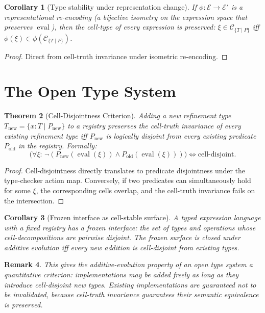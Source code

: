 \documentclass[11pt,a4paper]{article}
\newtheorem{theorem}{Theorem}[section]
\newtheorem{corollary}[theorem]{Corollary}
\newtheorem{remark}[theorem]{Remark}
\DeclareMathOperator{\eval}{eval}
\newcommand{\Cell}{\mathcal{C}}
\begin{document}
\begin{corollary}[Type stability under representation change]
\label{cor:type-stability}
If $\phi : \mathcal{E} \to \mathcal{E}'$ is a representational re-encoding (a bijective isometry on the expression space that preserves $\eval$), then the cell-type of every expression is preserved: $\xi \in \Cell_{\{T \mid P\}}$ iff $\phi(\xi) \in \phi(\Cell_{\{T \mid P\}})$.
\end{corollary}

\begin{proof}
Direct from cell-truth invariance under isometric re-encoding.
\end{proof}

\section{The Open Type System}
\label{sec:open-types}

\begin{theorem}[Cell-Disjointness Criterion]
\label{thm:cell-disjoint}
Adding a new refinement type $T_{\mathrm{new}} = \{x : T \mid P_{\mathrm{new}}\}$ to a registry preserves the cell-truth invariance of every existing refinement type iff $P_{\mathrm{new}}$ is logically disjoint from every existing predicate $P_{\mathrm{old}}$ in the registry. Formally:
\[
\bigl(\forall \xi : \, \neg(P_{\mathrm{new}}(\eval(\xi)) \wedge P_{\mathrm{old}}(\eval(\xi)))\bigr) \iff \mathrm{cell\text{-}disjoint}.
\]
\end{theorem}

\begin{proof}
Cell-disjointness directly translates to predicate disjointness under the type-checker action map. Conversely, if two predicates can simultaneously hold for some $\xi$, the corresponding cells overlap, and the cell-truth invariance fails on the intersection.
\end{proof}

\begin{corollary}[Frozen interface as cell-stable surface]
\label{cor:frozen-interface}
A typed expression language with a fixed registry has a \emph{frozen interface}: the set of types and operations whose cell-decompositions are pairwise disjoint. The frozen surface is closed under additive evolution iff every new addition is cell-disjoint from existing types.
\end{corollary}

\begin{remark}
This gives the additive-evolution property of an open type system a quantitative criterion: implementations may be added freely as long as they introduce cell-disjoint new types. Existing implementations are guaranteed not to be invalidated, because cell-truth invariance guarantees their semantic equivalence is preserved.
\end{remark}
\end{document}
